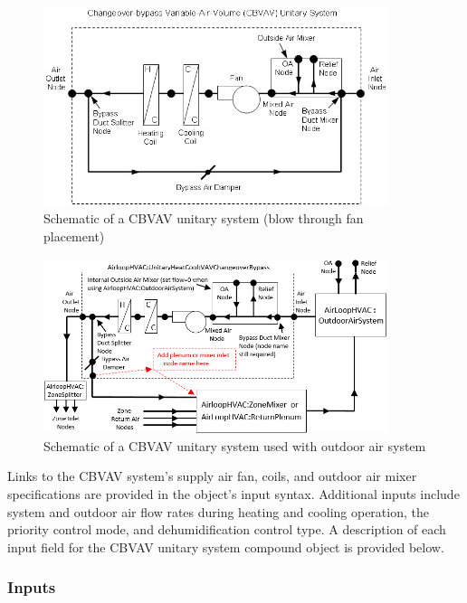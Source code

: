 \begin{figure}[hbtp] %
\centering
\includegraphics[width=0.9\textwidth, height=0.9\textheight, keepaspectratio=true]{media/image309.png}
\caption{Schematic of a CBVAV unitary system (blow through fan placement) \protect \label{fig:schematic-of-a-cbvav-unitary-system-blow}}
\end{figure}

\begin{figure}[hbtp]
\centering
\includegraphics[width=0.9\textwidth, height=0.9\textheight, keepaspectratio=true]{media/ChangeoverBypassVAV-ReturnPlenumOrMixer.png}
\caption{Schematic of a CBVAV unitary system used with outdoor air system \protect \label{fig:schematic-of-a-cbvav-unitary-system-used-with-outdoor-air-system}}
\end{figure}

Links to the CBVAV system's supply air fan, coils, and outdoor air mixer specifications are provided in the object's input syntax. Additional inputs include system and outdoor air flow rates during heating and cooling operation, the priority control mode, and dehumidification control type. A description of each input field for the CBVAV unitary system compound object is provided below.

\subsubsection{Inputs}\label{inputs-8-027}


